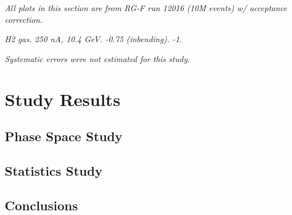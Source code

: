 \section*{}
\begin{frame}{}
    \label{12.00::study_results}
    \centering \Huge{}

    \vspace{9pt}

    \small{\textit{
        All plots in this section are from RG-F run 12016 (10M events) w/ acceptance correction.
    }}

    \small{\textit{
         H2 gas.
         250 nA, 10.4 GeV.
         -0.75 (inbending).
         -1.
    }}

    \small{\textit{
        Systematic errors were not estimated for this study.
    }}
\end{frame}

\section{Study Results}
\subsection{Phase Space Study}


\subsection{Statistics Study}


\subsection{Conclusions}

